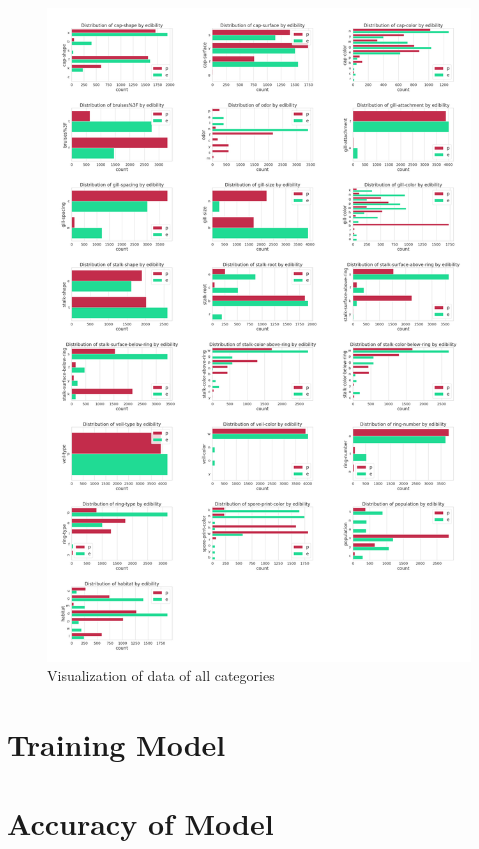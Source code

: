 \documentclass[]{article}
\begin{document}
\begin{figure}[!htb]
	\centering
	\includegraphics[scale=0.116]{visualize.jpeg}
	\caption{Visualization of data of all categories}
	\label{fig}
\end{figure}


\section{Training Model}

\section{Accuracy of Model}
\end{document}
